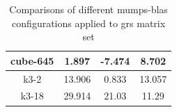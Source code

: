 \begin{table}[h!]
\begin{tabular}{|c|c|c|c|}
cube-645                                              & 1.897                                                                                                   & -7.474                                                                                               & 8.702                                                                                                   \\ \hline
k3-2                                                  & 13.906                                                                                                  & 0.833                                                                                                & 13.057                                                                                                  \\ \hline
k3-18                                                 & 29.914                                                                                                  & 21.03                                                                                                & 11.29                                                                                                   \\ \hline
\end{tabular}
\caption{Comparisons of different \acrshort{mumps}-\acrshort{blas} configurations applied to \acrshort{grs} matrix set}
\label{table:mumps-blas-performance-gain-grs}
\end{table}



